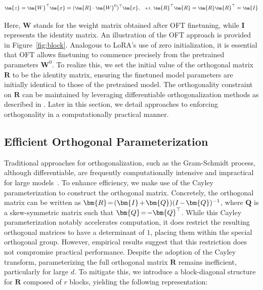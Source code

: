 \begin{equation}\label{eq:oft_general}
    \footnotesize
    \bm{z}=\bm{W}^\top\bm{x}=(\bm{R}\cdot\bm{W}^0)^\top\bm{x},~~~\text{s.t.}~\bm{R}^\top\bm{R}=\bm{R}\bm{R}^\top=\bm{I}
\end{equation}

Here, $\bm{W}$ stands for the weight matrix obtained after OFT finetuning, while $\bm{I}$ represents the identity matrix. An illustration of the OFT approach is provided in Figure~\ref{fig:block}. Analogous to LoRA’s use of zero initialization, it is essential that OFT allows finetuning to commence precisely from the pretrained parameters $\bm{W}^0$. To realize this, we set the initial value of the orthogonal matrix $\bm{R}$ to be the identity matrix, ensuring the finetuned model parameters are initially identical to those of the pretrained model. The orthogonality constraint on $\bm{R}$ can be maintained by leveraging differentiable orthogonalization methods as described in \cite{liu2021orthogonal,lezcano2019cheap}. Later in this section, we detail approaches to enforcing orthogonality in a computationally practical manner.

\subsection{Efficient Orthogonal Parameterization}\label{sect:eff_ortho}

Traditional approaches for orthogonalization, such as the Gram-Schmidt process, although differentiable, are frequently computationally intensive and impractical for large models~\cite{liu2021orthogonal}. To enhance efficiency, we make use of the Cayley parameterization to construct the orthogonal matrix. Concretely, the orthogonal matrix can be written as $\thickmuskip=2mu \medmuskip=2mu \bm{R}=(\bm{I}+\bm{Q})(I-\bm{Q})^{-1}$, where $\bm{Q}$ is a skew-symmetric matrix such that $\thickmuskip=2mu \medmuskip=2mu \bm{Q}=-\bm{Q}^\top$. While this Cayley parameterization notably accelerates computation, it does restrict the resulting orthogonal matrices to have a determinant of $1$, placing them within the special orthogonal group. However, empirical results suggest that this restriction does not compromise practical performance. Despite the adoption of the Cayley transform, parameterizing the full orthogonal matrix $\bm{R}$ remains inefficient, particularly for large $d$. To mitigate this, we introduce a block-diagonal structure for $\bm{R}$ composed of $r$ blocks, yielding the following representation:


